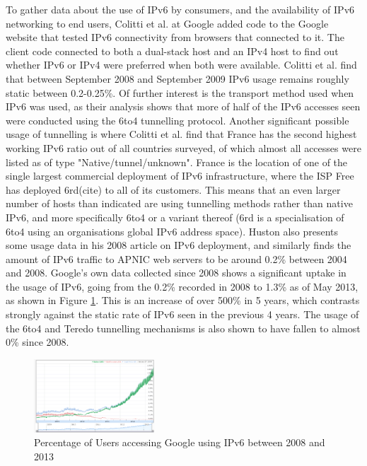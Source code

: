 To gather data about the use of IPv6 by consumers, and the availability of IPv6
networking to end users, Colitti et al. at Google added code to the Google
website that tested IPv6 connectivity from browsers that connected to it. The
client code connected to both a dual-stack host and an IPv4 host to find out
whether IPv6 or IPv4 were preferred when both were available. Colitti et al.
find that between September 2008 and September 2009 IPv6 usage remains roughly
static between 0.2-0.25\%. Of further interest is the transport method used when
IPv6 was used, as their analysis shows that more of half of the IPv6 accesses
seen were conducted using the 6to4 tunnelling protocol. Another significant
possible usage of tunnelling is where Colitti et al. find that France has the
second highest working IPv6 ratio out of all countries surveyed, of which
almost all accesses were listed as of type "Native/tunnel/unknown". France is
the location of one of the single largest commercial deployment of IPv6
infrastructure, where the ISP Free has deployed 6rd(cite) to all of its
customers. This means that an even larger number of hosts than indicated are
using tunnelling methods rather than native IPv6, and more specifically 6to4 or
a variant thereof (6rd is a specialisation of 6to4 using an organisations
global IPv6 address space). Huston also presents some usage data in his 2008
article on IPv6 deployment, and similarly finds the amount of IPv6 traffic to
APNIC web servers to be around 0.2\% between 2004 and 2008. Google's own data
collected since 2008 shows a significant uptake in the usage of IPv6, going from
the 0.2\% recorded in 2008 to 1.3\% as of May 2013, as shown in Figure
\ref{fig:google-access}. This is an increase of over
500\% in 5 years, which contrasts strongly against the static rate of IPv6 seen
in the previous 4 years. The usage of the 6to4 and Teredo tunnelling mechanisms
is also shown to have fallen to almost 0\% since 2008.

\begin{figure}[htb]
\centering
\includegraphics[width=0.4\textwidth]{img/v6-google-access.png}
\caption{Percentage of Users accessing Google using IPv6 between 2008 and 2013}
\label{fig:google-access}
\end{figure}

